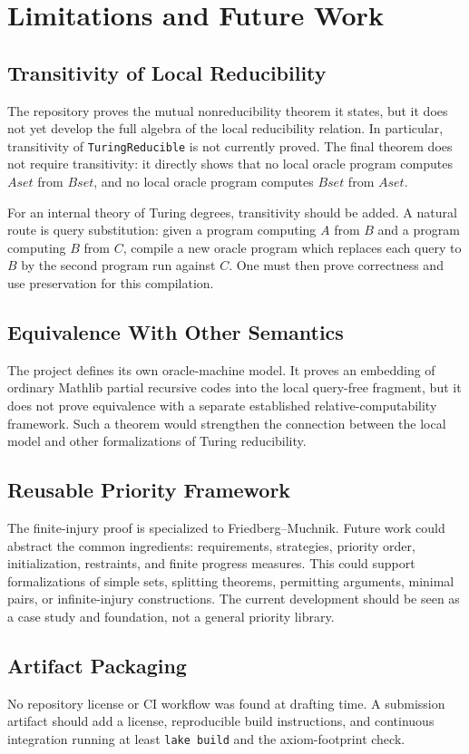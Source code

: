 \section{Limitations and Future Work}
\label{sec:limitations}

\subsection{Transitivity of Local Reducibility}

The repository proves the mutual nonreducibility theorem it states, but it
does not yet develop the full algebra of the local reducibility relation.
In particular, transitivity of \texttt{TuringReducible} is not currently
proved.  The final theorem does not require transitivity: it directly shows
that no local oracle program computes \(Aset\) from \(Bset\), and no local
oracle program computes \(Bset\) from \(Aset\).

For an internal theory of Turing degrees, transitivity should be added.  A
natural route is query substitution: given a program computing \(A\) from
\(B\) and a program computing \(B\) from \(C\), compile a new oracle program
which replaces each query to \(B\) by the second program run against
\(C\).  One must then prove correctness and use preservation for this
compilation.

\subsection{Equivalence With Other Semantics}

The project defines its own oracle-machine model.  It proves an embedding
of ordinary Mathlib partial recursive codes into the local query-free
fragment, but it does not prove equivalence with a separate established
relative-computability framework.  Such a theorem would strengthen the
connection between the local model and other formalizations of Turing
reducibility.

\subsection{Reusable Priority Framework}

The finite-injury proof is specialized to Friedberg--Muchnik.  Future work
could abstract the common ingredients: requirements, strategies, priority
order, initialization, restraints, and finite progress measures.  This
could support formalizations of simple sets, splitting theorems, permitting
arguments, minimal pairs, or infinite-injury constructions.  The current
development should be seen as a case study and foundation, not a general
priority library.

\subsection{Artifact Packaging}

No repository license or CI workflow was found at drafting time.  A
submission artifact should add a license, reproducible build instructions,
and continuous integration running at least \texttt{lake build} and the
axiom-footprint check.

